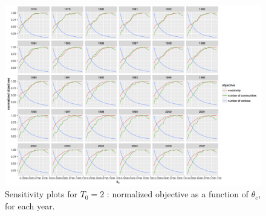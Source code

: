 \begin{figure}
\centering
\includegraphics[width=\textheight,height=\textwidth,angle=90]{figures/normalizedObjs-dispth_window3_eth4_1e-5.png}
\caption{Sensitivity plots for $T_0 = 2$ : normalized objective as a function of $\theta_c$, for each year.}
\label{fig:sensitivity-window3-3}
\end{figure}









